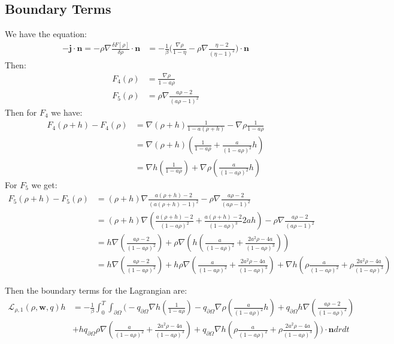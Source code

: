 \documentclass[11pt, a4paper]{article}
\theoremstyle{definition}
\newcommand{\w}{\mathbf{w}}
\newcommand{\n}{\mathbf{n}}
\begin{document}
\subsection{Boundary Terms}
We have the equation:
\begin{align*}
	- \mathbf{j} \cdot \n = -\rho \nabla \frac{\delta F[\rho]}{\delta \rho} \cdot \n &= -\frac{1}{\beta} \bigg(  \frac{\nabla \rho}{1 - \eta}  - \rho \nabla\frac{\eta - 2}{(\eta - 1)^2}  \bigg) \cdot \n
\end{align*}
Then:
\begin{align*}
	F_4(\rho) &= \frac{\nabla \rho}{1 - a \rho}\\
	F_5(\rho) &= \rho \nabla\frac{a \rho - 2}{(a \rho - 1)^2}  
\end{align*}
Then for $F_4$ we have:
\begin{align*}
	F_4(\rho+h) - F_4(\rho) &=\nabla (\rho + h) \frac{1}{1 - a (\rho + h)} - \nabla \rho \frac{1}{1 - a \rho}\\
	&= \nabla(\rho + h) \left(\frac{1}{1 - a\rho} + \frac{a}{(1 -a \rho)^2}h \right)\\
	&= \nabla h \left(\frac{1}{1 - a\rho}\right) + \nabla \rho \left( \frac{a}{(1 -a \rho)^2}h \right)
\end{align*}
For $F_5$ we get:
\begin{align*}
	F_5(\rho + h) - F_5(\rho) &= (\rho + h) \nabla\frac{a (\rho +h) - 2}{(a (\rho +h) - 1)^2}  - \rho \nabla\frac{a \rho - 2}{(a \rho - 1)^2} \\
	&=(\rho + h) \nabla \left( \frac{a (\rho +h) - 2}{(1- a \rho)^2} + \frac{a (\rho +h) - 2}{(1- a \rho)^3} 2ah\right) - \rho \nabla\frac{a \rho - 2}{(a \rho - 1)^2} \\
	&= h \nabla \left(\frac{a \rho  - 2}{(1- a \rho)^2}\right) + \rho \nabla \left( h\left( \frac{a}{(1- a \rho)^2} + \frac{2a^2\rho - 4a}{(1- a \rho)^3} \right)\right)\\
	&= h \nabla \left(\frac{a \rho  - 2}{(1- a \rho)^2}\right) + h \rho \nabla \left( \frac{a}{(1- a \rho)^2} + \frac{2a^2\rho - 4a}{(1- a \rho)^3} \right) + \nabla h \left( \rho \frac{a}{(1- a \rho)^2} + \rho\frac{2a^2\rho - 4a}{(1- a \rho)^3} \right)
\end{align*}

Then the boundary terms for the Lagrangian are:
\begin{align*}
	\mathcal{L}_{\rho,1}(\rho,\w, q) h &= - \frac{1}{\beta}\int_0^T \int_{\partial \Omega} \bigg(- q_{\partial \Omega}\nabla h \left(\frac{1}{1 - a\rho}\right) - q_{\partial \Omega}\nabla \rho \left( \frac{a}{(1 -a \rho)^2}h \right)+ q_{\partial \Omega}h \nabla \left(\frac{a \rho  - 2}{(1- a \rho)^2}\right) \\
	&+ h q_{\partial \Omega}\rho \nabla \left( \frac{a}{(1- a \rho)^2} + \frac{2a^2\rho - 4a}{(1- a \rho)^3} \right) + q_{\partial \Omega}\nabla h \left( \rho \frac{a}{(1- a \rho)^2} + \rho\frac{2a^2\rho - 4a}{(1- a \rho)^3} \right) \bigg) \cdot \n dr dt
\end{align*}
\end{document}
